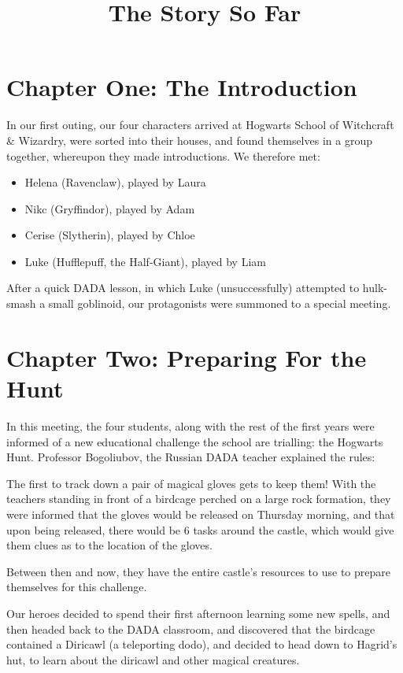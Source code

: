 \documentclass[oneside]{book}
\begin{document}
\title{{\HP The Story So Far}}

\maketitle

\section{Chapter One: The Introduction}


In our first outing, our four characters arrived at Hogwarts School of Witchcraft \& Wizardry, were sorted into their houses, and found themselves in a group together, whereupon they made introductions. We therefore met:
\begin{itemize}
	\item Helena (Ravenclaw), played by Laura
	\item Nikc (Gryffindor), played by Adam
	\item Cerise (Slytherin), played by Chloe
	\item Luke (Hufflepuff, the Half-Giant), played by Liam
\end{itemize}
After a quick DADA lesson, in which Luke (unsuccessfully) attempted to hulk-smash a small goblinoid, our protagonists were summoned to a special meeting. 

\section{Chapter Two: Preparing For the Hunt}

In this meeting, the four students, along with the rest of the first years were informed of a new educational challenge the school are trialling: the Hogwarts Hunt. Professor Bogoliubov, the Russian DADA teacher explained the rules:

The first to track down a pair of magical gloves gets to keep them! With the teachers standing in front of a birdcage perched on a large rock formation, they were informed that the gloves would be released on Thursday morning, and that upon being released, there would be 6 tasks around the castle, which would give them clues as to the location of the gloves.

Between then and now, they have the entire castle's resources to use to prepare themselves for this challenge. 

Our heroes decided to spend their first afternoon learning some new spells, and then headed back to the DADA classroom, and discovered that the birdcage contained a Diricawl (a teleporting dodo), and decided to head down to Hagrid's hut, to learn about the diricawl and other magical creatures. 
\end{document}

